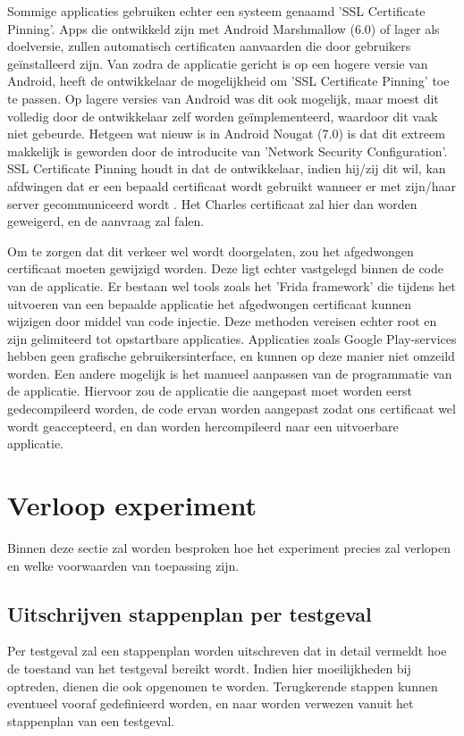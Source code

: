 Sommige applicaties gebruiken echter een systeem genaamd 'SSL Certificate Pinning'.  Apps die ontwikkeld zijn met Android Marshmallow (6.0) of lager als doelversie, zullen automatisch certificaten aanvaarden die door gebruikers geïnstalleerd zijn. Van zodra de applicatie gericht is op een hogere versie van Android, heeft de ontwikkelaar de mogelijkheid om 'SSL Certificate Pinning' toe te passen. Op lagere versies van Android was dit ook mogelijk, maar moest dit volledig door de ontwikkelaar zelf worden geïmplementeerd, waardoor dit vaak niet gebeurde. Hetgeen wat nieuw is in Android Nougat (7.0) is dat dit extreem makkelijk is geworden door de introducite van 'Network Security Configuration'. SSL Certificate Pinning houdt in dat de ontwikkelaar, indien hij/zij dit wil, kan afdwingen dat er een bepaald certificaat wordt gebruikt wanneer er met zijn/haar server gecommuniceerd wordt  \autocite{wass_ssl-pinning}. Het Charles certificaat zal hier dan worden geweigerd, en de aanvraag zal falen.

Om te zorgen dat dit verkeer wel wordt doorgelaten, zou het  afgedwongen certificaat moeten gewijzigd worden. Deze ligt echter vastgelegd binnen de code van de applicatie. Er bestaan wel tools zoals het 'Frida framework' die tijdens het uitvoeren van een bepaalde applicatie het afgedwongen certificaat kunnen wijzigen door middel van code injectie. Deze methoden vereisen echter root en zijn gelimiteerd tot opstartbare applicaties. Applicaties zoals Google Play-services hebben geen grafische gebruikersinterface, en kunnen op deze manier niet omzeild worden. Een andere mogelijk is het manueel aanpassen van de programmatie van de applicatie. Hiervoor zou de applicatie die aangepast moet worden eerst gedecompileerd worden, de code ervan worden aangepast zodat ons certificaat wel wordt geaccepteerd, en dan worden hercompileerd naar een uitvoerbare applicatie. 

\section{Verloop experiment}
\label{sec:conditionsexperiment}
Binnen deze sectie zal worden besproken hoe het experiment precies zal verlopen en welke voorwaarden van toepassing zijn.

\subsection{Uitschrijven stappenplan per testgeval}
Per testgeval zal een stappenplan worden uitschreven dat in detail vermeldt hoe de toestand van het testgeval bereikt wordt. Indien hier moeilijkheden bij optreden, dienen die ook opgenomen te worden. Terugkerende stappen kunnen eventueel vooraf gedefinieerd worden, en naar worden verwezen vanuit het stappenplan van een testgeval.


